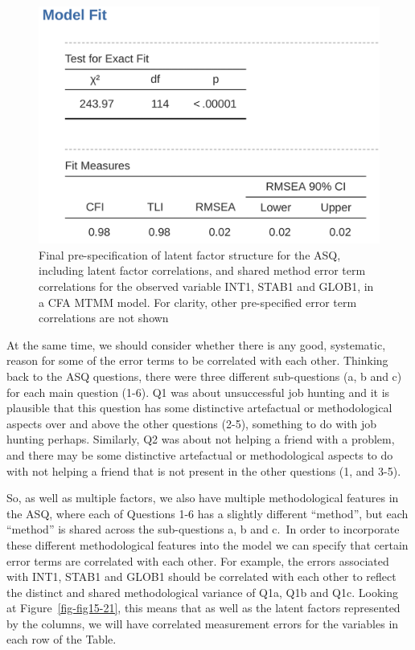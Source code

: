 \documentclass[
  a4paper,
]{book}
\begin{document}
\begin{figure}

\includegraphics[width=1\textwidth,height=\textheight]{images/fig15-23.png} \hfill{}

\caption{\label{fig-fig15-23}Final pre-specification of latent factor
structure for the ASQ, including latent factor correlations, and shared
method error term correlations for the observed variable INT1, STAB1 and
GLOB1, in a CFA MTMM model. For clarity, other pre-specified error term
correlations are not shown}

\end{figure}

At the same time, we should consider whether there is any good,
systematic, reason for some of the error terms to be correlated with
each other. Thinking back to the ASQ questions, there were three
different sub-questions (a, b and c) for each main question (1-6). Q1
was about unsuccessful job hunting and it is plausible that this
question has some distinctive artefactual or methodological aspects over
and above the other questions (2-5), something to do with job hunting
perhaps. Similarly, Q2 was about not helping a friend with a problem,
and there may be some distinctive artefactual or methodological aspects
to do with not helping a friend that is not present in the other
questions (1, and 3-5).

So, as well as multiple factors, we also have multiple methodological
features in the ASQ, where each of Questions 1-6 has a slightly
different ``method'', but each ``method'' is shared across the
sub-questions a, b and c.~In order to incorporate these different
methodological features into the model we can specify that certain error
terms are correlated with each other. For example, the errors associated
with INT1, STAB1 and GLOB1 should be correlated with each other to
reflect the distinct and shared methodological variance of Q1a, Q1b and
Q1c. Looking at Figure~\ref{fig-fig15-21}, this means that as well as
the latent factors represented by the columns, we will have correlated
measurement errors for the variables in each row of the Table.
\end{document}
